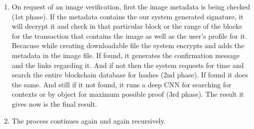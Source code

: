 \begin{enumerate}
\item On request of an image verification, first the image metadata is being checked (1st phase). If the metadata contains the our system generated signature, it will decrypt it and check in that particular block or the range of the blocks for the transaction that contains the image as well as the user's profile for it. Becacuse while creating downloadable file the system encrypts and adds the metadata in the image file. If found, it generates the confirmation message and the links regarding it. And if not then the system requests for time and search the entire blockchain database for hashes (2nd phase). If found it does the same. And still if it not found, it runs a deep CNN for searching for contexts or by object for maximum possible proof (3rd phase). The result it gives now is the final result.
\item The process continues again and again recursively.
\end{enumerate}
